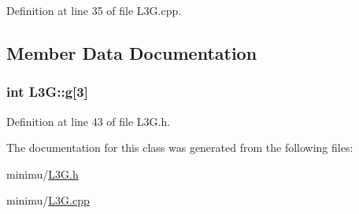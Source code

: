 \-Definition at line 35 of file \-L3\-G.\-cpp.



\subsection{\-Member \-Data \-Documentation}
\hypertarget{class_l3_g_a0cb874e50a2ea4753d81e9a46c7e45ce}{
\subsubsection[{g}]{\setlength{\rightskip}{0pt plus 5cm}int {\bf \-L3\-G\-::g}\mbox{[}3\mbox{]}}}\label{class_l3_g_a0cb874e50a2ea4753d81e9a46c7e45ce}


\-Definition at line 43 of file \-L3\-G.\-h.



\-The documentation for this class was generated from the following files\-:\begin{DoxyCompactItemize}
\item 
minimu/\hyperlink{_l3_g_8h}{\-L3\-G.\-h}\item 
minimu/\hyperlink{_l3_g_8cpp}{\-L3\-G.\-cpp}\end{DoxyCompactItemize}
